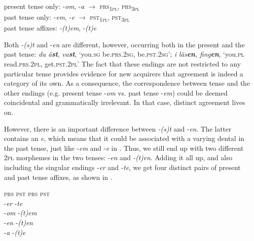 \documentclass[output=paper,colorlinks,citecolor=brown,draft,draftmode]{langscibook}
\begin{document}
\ea\label{ex:petzell:28}
\ea\label{ex:petzell:28a}  present tense only:    -\textit{om}, -\textit{a}    $\to$ \textsc{prs}\textsubscript{1}\textsc{\textsubscript{pl}}, \textsc{prs}\textsubscript{3}\textsc{\textsubscript{pl}}\\
\ex\label{ex:petzell:28b}  past tense only:    -\textit{em}, -\textit{e}   $\to$ \textsc{pst}\textsubscript{1}\textsc{\textsubscript{pl}}, \textsc{pst}\textsubscript{3}\textsc{\textsubscript{pl}}  \\
\ex\label{ex:petzell:28c}  past tense affixes:   \textit{-(t)em}, -\textit{(t)e}
\z
\z


Both \textit{-(s)t} and -\textit{en} are different, however, occurring both in the present and the past tense: \textit{du ä\textbf{{st}}}, \textit{va\textbf{{st}}}, ‘you.\textsc{sg} be.\textsc{prs}.2\textsc{sg}, be.\textsc{pst}.2\textsc{sg}’; \textit{i läs\textbf{{en}}}\textit{, fing\textbf{{en}}}, ‘you.\textsc{pl} read.\textsc{prs}.2\textsc{pl}, get.\textsc{pst}.2\textsc{pl}’ The fact that these endings are not restricted to any particular tense provides evidence for new acquirers that agreement is indeed a category of its own. As a consequence, the correspondence between tense and the other endings (e.g. present tense \nobreakdash-\textit{om} vs. past tense \nobreakdash-\textit{em}) could be deemed coincidental and grammatically irrelevant. In that case, distinct agreement lives on.



However, there is an important difference between \textit{-(s)t} and -\textit{en}. The latter contains an \textit{e}, which means that it could be associated with a varying dental in the past tense, just like \nobreakdash-\textit{em} and -\textit{e} in . Thus, we still end up with two different 2\textsc{pl} morphemes in the two tenses: -\textit{en} and \textit{-(t)en}. Adding it all up, and also including the singular endings \nobreakdash-\textit{er} and \nobreakdash-\textit{te}, we get four distinct pairs of present and past tense affixes, as shown in .\largerpage


\ea\label{ex:petzell:29}
\begin{tabbing}
\textsc{prs} \hspace{2\tabcolsep} \= \textsc{pst}\kill
\textsc{prs}       \>        \textsc{pst}\\
-\textit{er}       \>         -\textit{te}  \\
-\textit{om}       \>       -\textit{(t)em}  \\
-\textit{en}       \>       -\textit{(t)en}  \\
-\textit{a}        \>       -\textit{(t)e}
\end{tabbing}
\z
\end{document}

